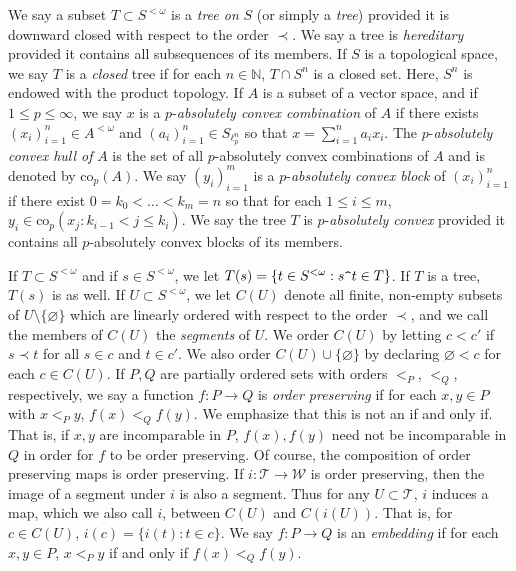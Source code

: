 \documentclass[12pt]{amsart}
\theoremstyle{definition}
\newcommand{\nn}{\mathbb{N}}
\newcommand{\ttt}{\mathcal{T}}
\newcommand{\www}{\mathcal{W}}
\begin{document}
We say a subset $T\subset S^{<\omega}$ is a \emph{tree on} $S$ (or simply a \emph{tree}) provided it is downward closed with respect to the order $\prec$.  We say a tree is \emph{hereditary} provided it contains all subsequences of its members. If $S$ is a topological space, we say $T$ is a \emph{closed} tree if for each $n\in \nn$, $T\cap S^n$ is a closed set. Here, $S^n$ is endowed with the product topology.   If $A$ is a subset of a vector space, and if $1\leqslant p\leqslant \infty$, we say $x$ is a $p$-\emph{absolutely convex combination} of $A$ if there exists $(x_i)_{i=1}^n\in A^{<\omega}$ and $(a_i)_{i=1}^n\in S_{\ell_p^n}$ so that $x=\sum_{i=1}^n a_ix_i$.  The $p$-\emph{absolutely convex hull of} $A$ is the set of all $p$-absolutely convex combinations of $A$ and is denoted by $\text{co}_p(A)$.  We say $(y_i)_{i=1}^m$ is a $p$-\emph{absolutely convex block} of $(x_i)_{i=1}^n$ if there exist $0=k_0<\ldots<k_m=n$ so that for each $1\leqslant i\leqslant m$, $y_i\in \text{co}_p (x_j: k_{i-1}<j\leqslant k_i)$.  We say the tree $T$ is $p$-\emph{absolutely convex} provided it contains all $p$-absolutely convex blocks of its members.  


If $T\subset S^{<\omega}$ and if $s\in S^{<\omega}$, we let $T(s)=\{t\in S^{<\omega}: s\verb!^!t\in T\}$.  If $T$ is a tree, $T(s)$ is as well.  If $U\subset S^{<\omega}$, we let $C(U)$ denote all finite, non-empty subsets of $U\setminus \{\varnothing\}$ which are linearly ordered with respect to the order $\prec$, and we call the members of $C(U)$ the \emph{segments} of $U$.  We order $C(U)$ by letting $c<c'$ if $s\prec t$ for all $s\in c$ and $t\in c'$.  We also order $C(U)\cup \{\varnothing\}$ by declaring $\varnothing <c$ for each $c\in C(U)$. If $P, Q$ are partially ordered sets with orders $<_P$, $<_Q$, respectively, we say a function $f:P\to Q$ is \emph{order preserving} if for each $x,y\in P$ with $x<_P y$, $f(x)<_Q f(y)$.  We emphasize that this is not an if and only if.  That is, if $x,y$ are incomparable in $P$, $f(x), f(y)$ need not be incomparable in $Q$ in order for $f$ to be order preserving. Of course, the composition of order preserving maps is order preserving.  If $i:\ttt\to \www$ is order preserving, then the image of a segment under $i$ is also a segment.  Thus for any $U\subset\ttt$, $i$ induces a map, which we also call $i$, between $C(U)$ and $C(i(U))$.  That is, for $c\in C(U)$, $i(c)=\{i(t): t\in c\}$.   We say $f:P\to Q$ is an \emph{embedding} if for each $x,y\in P$, $x<_P y$ if and only if $f(x)<_Q f(y)$.  
\end{document}

